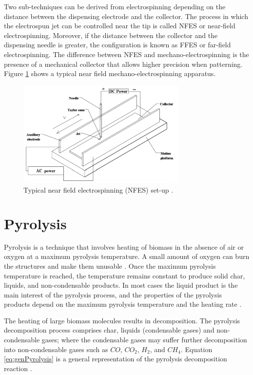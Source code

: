 Two sub-techniques can be derived from electrospinning depending on the distance between the dispensing electrode and the collector. The process in which the electrospun jet can be controlled near the tip is called NFES or near-field electrospinning. \cite{Cisquella-Serra2019} Moreover, if the distance between the collector and the dispensing needle is greater, the configuration is known as FFES or far-field electrospinning. \cite{Nataraj2012} The difference between NFES and mechano-electrospinning is the presence of a mechanical collector that allows higher precision when patterning. Figure \ref{fig:NFES} shows a typical near field mechano-electrospinning apparatus.

\begin{figure}[th]
\centering
\includegraphics[width=0.75\textwidth]{./Figures/NFES.png}
\decoRule
\caption[Near Field Electrospinning set-up]{Typical near field electrospinning (NFES) set-up \cite{Zhu2016}.}
\label{fig:NFES}
\end{figure}

\section{Pyrolysis} \label{sec:pyrolysis}
Pyrolysis is a technique that involves heating of biomass in the absence of air or oxygen at a maximum pyrolysis temperature. A small amount of oxygen can burn the structures and make them unusable \cite{Pramanick2018}. Once the maximum pyrolysis temperature is reached, the temperature remains constant to produce solid char, liquids, and non-condensable products. In most cases the liquid product is the main interest of the pyrolysis process, and the properties of the pyrolysis products depend on the maximum pyrolysis temperature and the heating rate \cite{Pramanick2018,Basu2018}.

The heating of large biomass molecules results in decomposition. The pyrolysis decomposition process comprises char, liquids (condensable gases) and non-condensable gases; where the condensable gases may suffer further decomposition into non-condensable gases such as $C O$, $C O_{2}$, $H_{2}$, and $C H_{4}$. Equation \ref{eq:genPyrolysis} is a general representation of the pyrolysis decomposition reaction \cite{Basu2018}.


